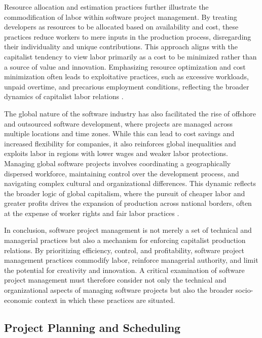 \begin{refsection}
Resource allocation and estimation practices further illustrate the commodification of labor within software project management. By treating developers as resources to be allocated based on availability and cost, these practices reduce workers to mere inputs in the production process, disregarding their individuality and unique contributions. This approach aligns with the capitalist tendency to view labor primarily as a cost to be minimized rather than a source of value and innovation. Emphasizing resource optimization and cost minimization often leads to exploitative practices, such as excessive workloads, unpaid overtime, and precarious employment conditions, reflecting the broader dynamics of capitalist labor relations \cite[pp.~67-69]{Thompson1989WorkOrganizations}.

The global nature of the software industry has also facilitated the rise of offshore and outsourced software development, where projects are managed across multiple locations and time zones. While this can lead to cost savings and increased flexibility for companies, it also reinforces global inequalities and exploits labor in regions with lower wages and weaker labor protections. Managing global software projects involves coordinating a geographically dispersed workforce, maintaining control over the development process, and navigating complex cultural and organizational differences. This dynamic reflects the broader logic of global capitalism, where the pursuit of cheaper labor and greater profits drives the expansion of production across national borders, often at the expense of worker rights and fair labor practices \cite[pp.~180-183]{Friedman2012WorldIsFlat}.

In conclusion, software project management is not merely a set of technical and managerial practices but also a mechanism for enforcing capitalist production relations. By prioritizing efficiency, control, and profitability, software project management practices commodify labor, reinforce managerial authority, and limit the potential for creativity and innovation. A critical examination of software project management must therefore consider not only the technical and organizational aspects of managing software projects but also the broader socio-economic context in which these practices are situated.

\subsection{Project Planning and Scheduling}


\end{refsection}
